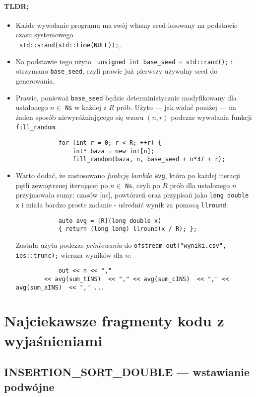 \documentclass{article}
\begin{document}
	\paragraph{TLDR;}
	\begin{itemize}
		\item Każde wywołanie programu ma swój własny seed losowany na podstawie czasu systemowego\\ \texttt{ std::srand(std::time(NULL));},
		\item Na podstawie tego użyto \texttt{ unsigned int base\_seed = std::rand();} i otrzymano \texttt{base\_seed}, czyli prawie już pierwszy używalny seed do generowania,
		\item Prawie, ponieważ \texttt{base\_seed} będzie deterministycznie modyfikowany dla ustalonego $n \in$ \texttt{Ns} w każdej z $R$ prób. Użyto — jak widać poniżej — na żaden sposób niewyróżniającego się wzoru $(n,r)$ podczas wywołania funkcji \texttt{fill\_random}.
		\begin{lstlisting}
			for (int r = 0; r < R; ++r) {
				int* baza = new int[n];
				fill_random(baza, n, base_seed + n*37 + r);
		\end{lstlisting}
		\item Warto dodać, że zastosowano \emph{funkcję lambda} \texttt{avg}, która po każdej iteracji pętli zewnętrznej iterującej po $n \in$ \texttt{Ns}, czyli po $R$ prób dla ustalonego $n$ przyjmowała sumy: czasów [ns], powtórzeń oraz przypisań jako \texttt{long double x} i miała bardzo proste zadanie - uśrednić wynik za pomocą \texttt{llround}:
		\begin{lstlisting}
			auto avg = [R](long double x)
			{ return (long long) llround(x / R); }; 
			\end{lstlisting}
		Została użyta podczas \emph{printowania} do \texttt{ofstream out("wyniki.csv", ios::trunc);} wiersza wyników dla $n$:
		\begin{lstlisting}
			out << n << ","
		<< avg(sum_tINS)  << "," << avg(sum_cINS)  << "," << avg(sum_aINS)  << "," ...
		\end{lstlisting}
	\end{itemize}
	
	
	\section{Najciekawsze fragmenty kodu z wyjaśnieniami}
	
	\subsection*{INSERTION\_SORT\_DOUBLE — wstawianie podwójne}
	
\end{document}
